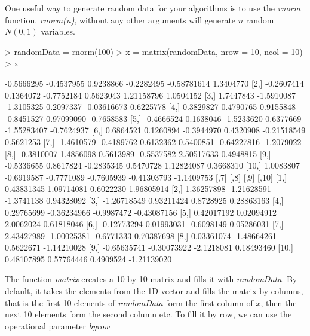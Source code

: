 \documentclass{article}
\begin{document}
One useful way to generate random data for your algorithms is to use
the \textit{rnorm} function.  \textit{rnorm(n)}, without any other arguments
will generate $n$ random $N(0,1)$ variables.  

\begin{Schunk}
\begin{Sinput}
> randomData = rnorm(100)
> x = matrix(randomData, nrow = 10, ncol = 10)
> x
\end{Sinput}
\begin{Soutput}
            [,1]       [,2]       [,3]       [,4]        [,5]       [,6]
 [1,] -0.5666295 -0.4537955  0.9238866 -0.2282495 -0.58781614  1.3404770
 [2,] -0.2607414  0.1364072 -0.7752184  0.5623043  1.21158796  1.0504152
 [3,]  1.7447843 -1.5910087 -1.3105325  0.2097337 -0.03616673  0.6225778
 [4,]  0.3829827  0.4790765  0.9155848 -0.8451527  0.97099090 -0.7658583
 [5,] -0.4666524  0.1638046 -1.5233620  0.6377669 -1.55283407 -0.7624937
 [6,]  0.6864521  0.1260894 -0.3944970  0.4320908 -0.21518549  0.5621253
 [7,] -1.4610579 -0.4189762  0.6132362  0.5400851 -0.64227816 -1.2079022
 [8,] -0.3810007  1.4856098  0.5613989 -0.5537582  2.50517633  0.4948815
 [9,] -0.5336655  0.8617824 -0.2835345  0.5470728  1.12824087  0.3668310
[10,]  1.0083807 -0.6919587 -0.7771089 -0.7605939 -0.41303793 -1.1409753
             [,7]        [,8]       [,9]       [,10]
 [1,]  0.43831345  1.09714081  0.6022230  1.96805914
 [2,]  1.36257898 -1.21628591 -1.3741138  0.94328092
 [3,] -1.26718549  0.93211424  0.8728925  0.28863163
 [4,]  0.29765699 -0.36234966 -0.9987472 -0.43087156
 [5,]  0.42017192  0.02094912  2.0062024  0.61818046
 [6,] -0.12773294  0.01993031 -0.6098149  0.05286031
 [7,]  2.43427989 -1.00025381 -0.6771333  0.70387698
 [8,]  0.03361074 -1.48664261  0.5622671 -1.14210028
 [9,] -0.65635741 -0.30073922 -2.1218081  0.18493460
[10,]  0.48107895  0.57764446  0.4909524 -1.21139020
\end{Soutput}
\end{Schunk}

The function \textit{matrix} creates a 10 by 10 matrix and fills it with
\textit{randomData}.  By default, it takes the elements from the 1D vector
and fills the matrix by columns, that is the first 10 elements of
\textit{randomData} form the first column of $x$, then the next 10 elements
form the second column etc.  To fill it by row, we can use the operational
parameter \textit{byrow}
\end{document}
